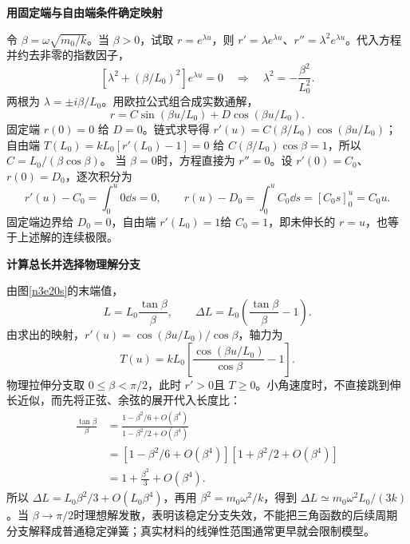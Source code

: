 \begin{solution}
\par\medskip{}\noindent\textbf{用固定端与自由端条件确定映射}\par\nobreak
令 $\beta=\omega\sqrt{m_0/k}$。当 $\beta>0$，试取 $r=e^{\lambda u}$，则 $r'=\lambda e^{\lambda u}$、$r''=\lambda^2e^{\lambda u}$。代入方程并约去非零的指数因子，
\[
 [\lambda^2+(\beta/L_0)^2]e^{\lambda u}=0
 \quad\Longrightarrow\quad \lambda^2=-\frac{\beta^2}{L_0^2}.
\]
两根为 $\lambda=\pm i\beta/L_0$。用欧拉公式组合成实数通解，
\[
r=C\sin(\beta u/L_0)+D\cos(\beta u/L_0).
\]
固定端 $r(0)=0$ 给 $D=0$。链式求导得
$r'(u)=C(\beta/L_0)\cos(\beta u/L_0)$；
自由端 $T(L_0)=kL_0[r'(L_0)-1]=0$ 给
$C(\beta/L_0)\cos\beta=1$，所以 $C=L_0/(\beta\cos\beta)$。
当 $\beta=0$时，方程直接为 $r''=0$。设 $r'(0)=C_0$、$r(0)=D_0$，逐次积分为
\[
 r'(u)-C_0=\int_0^u0\dd s=0,\qquad
 r(u)-D_0=\int_0^u C_0\dd s=[C_0s]_0^u=C_0u.
\]
固定端边界给 $D_0=0$，自由端 $r'(L_0)=1$给 $C_0=1$，即未伸长的 $r=u$，也等于上述解的连续极限。



\par\medskip{}\noindent\textbf{计算总长并选择物理解分支}\par\nobreak
由图\ref{n3e20s}的末端值，
\[L=L_0\frac{\tan\beta}{\beta},\qquad
\Delta L=L_0\left(\frac{\tan\beta}{\beta}-1\right).\]
由求出的映射，$r'(u)=\cos(\beta u/L_0)/\cos\beta$，轴力为
\[
 T(u)=kL_0\left[\frac{\cos(\beta u/L_0)}{\cos\beta}-1\right].
\]
物理拉伸分支取 $0\le\beta<\pi/2$，此时 $r'>0$且 $T\ge0$。小角速度时，不直接跳到伸长近似，而先将正弦、余弦的展开代入长度比：
\begin{align*}
 \frac{\tan\beta}{\beta}
 &=\frac{1-\beta^2/6+O(\beta^4)}{1-\beta^2/2+O(\beta^4)}\\
 &=[1-\beta^2/6+O(\beta^4)][1+\beta^2/2+O(\beta^4)]\\
 &=1+\frac{\beta^2}{3}+O(\beta^4).
\end{align*}
所以 $\Delta L=L_0\beta^2/3+O(L_0\beta^4)$，再用 $\beta^2=m_0\omega^2/k$，得到 $\Delta L\simeq m_0\omega^2L_0/(3k)$。当 $\beta\to\pi/2$时理想解发散，表明该稳定分支失效，不能把三角函数的后续周期分支解释成普通稳定弹簧；真实材料的线弹性范围通常更早就会限制模型。
\end{solution}

